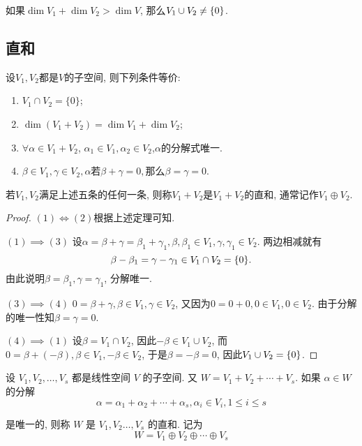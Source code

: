 \documentclass{ctexart}
\begin{document}
\begin{corollary}
    如果$\dim V_1+\dim V_2>\dim V$, 那么$V_1\cup V_2 \neq \{0\}$.
\end{corollary}

\subsection{直和} 

\begin{theorem}[直和的等价定义]
    设$V_{1},V_{2}$都是$V$的子空间, 则下列条件等价:
    \begin{enumerate}
        \item $V_{1}\cap V_{2}=\{0\}$;
        \item $\dim(V_{1}+V_{2})=\dim V_{1}+\dim V_{2}$;
        \item $\forall\alpha\in V_{1}+V_{2}$, $\alpha_{1}\in V_{1},\alpha_{2}\in V_{2}$,$\alpha$的分解式唯一. 
        \item $\beta\in V_1,\gamma\in V_2,\alpha$若$\beta+\gamma=0,$那么$\beta=\gamma=0$.
    \end{enumerate}
\end{theorem}

若$V_{1},V_{2}$满足上述五条的任何一条, 则称$V_{1}+V_{2}$是$V_{1}+V_{2}$的直和, 通常记作$V_{1}\oplus V_{2}$.

\begin{proof}
    $(1)\iff (2)$根据上述定理可知. 

    $(1)\implies (3)$ 设$\alpha=\beta+\gamma=\beta_1+\gamma_1,\beta,\beta_1\in V_1,\gamma,\gamma_1\in V_2$. 两边相减就有
    \[
        \beta-\beta_1=\gamma-\gamma_1\in V_1\cap V_2=\{0\}.
    \]
    由此说明$\beta=\beta_1,\gamma=\gamma_1$, 分解唯一. 

    $(3)\implies (4)$ $0=\beta+\gamma,\beta\in V_1, \gamma\in V_2$, 又因为$0=0+0,0\in V_1,0\in V_2$. 由于分解的唯一性知$\beta=\gamma=0$.

    $(4)\implies (1)$ 设$\beta=V_1\cap V_2$, 因此$-\beta\in V_1\cup V_2$, 而$0=\beta+(-\beta), \beta\in V_1, -\beta\in V_2$, 于是$\beta=-\beta=0$, 因此$V_1\cup V_2=\{0\}$. 



\end{proof}

\begin{definition}[直和]
    设 $V_1, V_2, \ldots, V_s$ 都是线性空间 $V$ 的子空间. 又 $W=V_1+V_2+\cdots+V_s$. 如果 $\alpha \in W$ 的分解
$$
\alpha=\alpha_1+\alpha_2+\cdots+\alpha_s, \alpha_i \in V_i, 1 \leq i \leq s
$$

是唯一的, 则称 $W$ 是 $V_1, V_2 \ldots, V_s$ 的直和. 记为
$$
W=V_1 \oplus V_2 \oplus \cdots \oplus V_s
$$
\end{definition}
\end{document}
